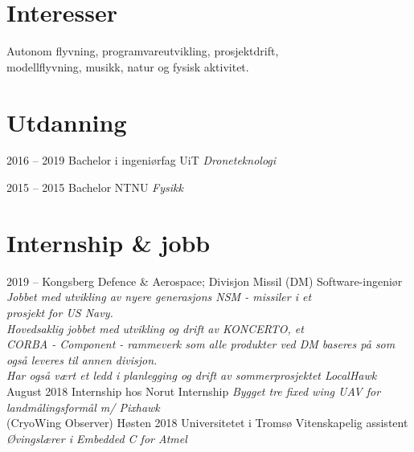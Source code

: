 \documentclass[]{friggeri-cv}
\begin{document}
\section{Interesser}

Autonom flyvning, programvareutvikling, prosjektdrift,\\ modellflyvning, musikk, natur og fysisk aktivitet.

\section{Utdanning}

\begin{entrylist}
  \entry
    {2016 -- 2019}
    {Bachelor i ingeniørfag}
    {UiT}
    {\emph{Droneteknologi}}
    
  \entry
    {2015 -- 2015}
    {Bachelor}
    {NTNU}
    {\emph{Fysikk}}
\end{entrylist}


\section{Internship \& jobb}
\begin{entrylist}
	\entry
	{2019 --}
	{Kongsberg Defence \& Aerospace; Divisjon Missil (DM)}
	{Software-ingeniør}
	{\emph{Jobbet med utvikling av nyere generasjons NSM - missiler i et \\ prosjekt for US Navy. \\
	Hovedsaklig jobbet med utvikling og drift av KONCERTO, et \\CORBA - Component - rammeverk som alle produkter ved DM baseres på som også leveres til annen divisjon.\\
	Har også vært et ledd i planlegging og drift av sommerprosjektet LocalHawk}}
    \entry
    {August 2018}
    {Internship hos Norut}
    {Internship}
    {\emph{Bygget tre fixed wing UAV for landmålingsformål m/ Pixhawk}\\(CryoWing Observer)}
	\entry
   {Høsten 2018}
   {Universitetet i Tromsø}
   {Vitenskapelig assistent}
   {\emph{Øvingslærer i Embedded C for Atmel}}    
    
\end{entrylist}

%
\end{document}
